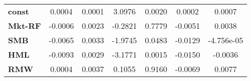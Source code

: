 \begin{center}
\begin{tabular}{lcccccc}
\midrule
\textbf{const}  &       0.0004       &       0.0001       &      3.0976     &      0.0020      &       0.0002      &       0.0007       \\
\textbf{Mkt-RF} &      -0.0006       &       0.0023       &     -0.2821     &      0.7779      &      -0.0051      &       0.0038       \\
\textbf{SMB}    &      -0.0065       &       0.0033       &     -1.9745     &      0.0483      &      -0.0129      &     -4.756e-05     \\
\textbf{HML}    &      -0.0093       &       0.0029       &     -3.1771     &      0.0015      &      -0.0150      &      -0.0036       \\
\textbf{RMW}    &       0.0004       &       0.0037       &      0.1055     &      0.9160      &      -0.0069      &       0.0077       \\
\bottomrule
\end{tabular}
\end{center}
